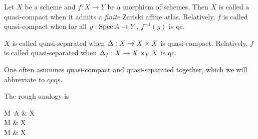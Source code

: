 \documentclass[./main.tex]{subfiles}
\begin{document}
\begin{dfn}
  
  Let $X$ be a scheme and $f : X \to Y$ be a morphism of schemes.
  Then $X$ is called a quasi-compact when
  it admits a \emph{finite} Zariski affine atlas.
  Relatively, $f$ is called quasi-compact when for all $y : \operatorname{Spec} A \to Y$,
  $f^{-1}(y)$ is qc.

  $X$ is called quasi-separated when
  $\Delta : X \to X \times X$ is quasi-compact.
  Relatively, $f$ is called quasi-separated when $\Delta_f : X \to X \times_Y X$ is qc.

  One often asummes quasi-compact and quasi-separated together,
  which we will abbreviate to qcqs.
\end{dfn}

The rough analogy is 
\begin{cd}
  {M \,A} & {X } \\
	{M } & {X } \\
	{M } & {X }
\end{cd}
\end{document}
